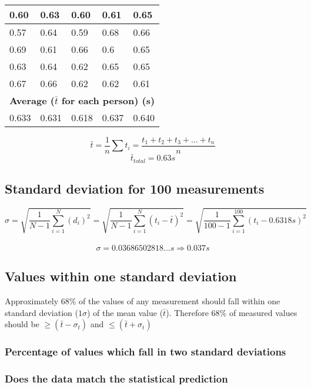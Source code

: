 \documentclass[11pt, letterpaper, includehead]{article}
\begin{document}
\begin{center}
\begin{tabular}{|  m{2cm} | m{2cm} | m{2cm} | m{2cm} | m{2cm} | }
    \hline
    0.60          & 0.63           & 0.60         & 0.61           & 0.65          \\
    \hline
    0.57          & 0.64           & 0.59         & 0.68           & 0.66          \\
    \hline
    0.69          & 0.61           & 0.66         & 0.6            & 0.65          \\
    \hline
    0.63          & 0.64           & 0.62         & 0.65           & 0.65          \\
    \hline
    0.67          & 0.66           & 0.62         & 0.62           & 0.61          \\
    \hline\hline
    \multicolumn{5}{|c|}{\textbf{Average ($\bar{t}$ for each person) (s)}} \\
    \hline
    0.633         & 0.631          & 0.618        & 0.637          & 0.640         \\
    \hline
  \end{tabular}
\end{center}
$$\bar{t} = \frac{1}{n}\sum t_i = \frac{t_1 + t_2 + t_3 + ... + t_n}{n}$$
$$\bar{t}_{total} = \boxed{0.63s}$$

\subsection{Standard deviation for 100 measurements} %
$$\sigma = \sqrt{\frac{1}{N - 1}\sum_{i = 1}^{N} (d_i)^2} = \sqrt{\frac{1}{N - 1}\sum_{i = 1}^{N} (t_i - \bar{t})^2}= \sqrt{\frac{1}{100 - 1}\sum_{i = 1}^{100}(t_i - 0.6318s)^2}$$\\
$$\sigma = 0.03686502818...s \Rightarrow \boxed{0.037s}$$

\subsection{Values within one standard deviation} %
Approximately $68\%$ of the values of any measurement should fall within one
standard deviation ($1 \sigma$) of the mean value ($\bar{t}$). Therefore $68\%$ of measured
values should be $\geq (\bar{t} - \sigma_t)$ and $\leq (\bar{t} + \sigma_t)$

\subsubsection{Percentage of values which fall in two standard deviations}

\subsubsection{Does the data match the statistical prediction}
\end{document}
